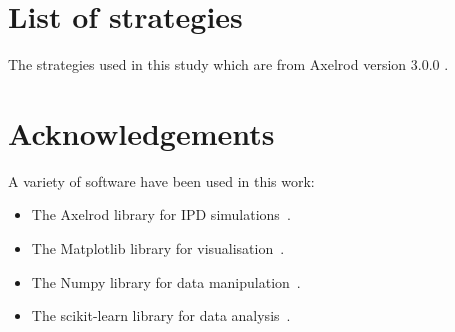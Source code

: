 \documentclass{article}
\begin{document}



\appendix

\section{List of strategies}\label{app:list_of_players}

The strategies used in this study which are from Axelrod version 3.0.0
\cite{axelrodproject}.

\begin{multicols}{3}
	\begin{enumerate}
		
	\end{enumerate}
\end{multicols}

\section{Acknowledgements}

A variety of software have been used in this work:

\begin{itemize}
    \item The Axelrod library for IPD simulations~\cite{axelrodproject}.
    \item The Matplotlib library for visualisation~\cite{hunter2007matplotlib}.
    \item The Numpy library for data manipulation~\cite{walt2011numpy}.
    \item The scikit-learn library for data analysis~\cite{scikit-learn}.
\end{itemize}
\end{document}
